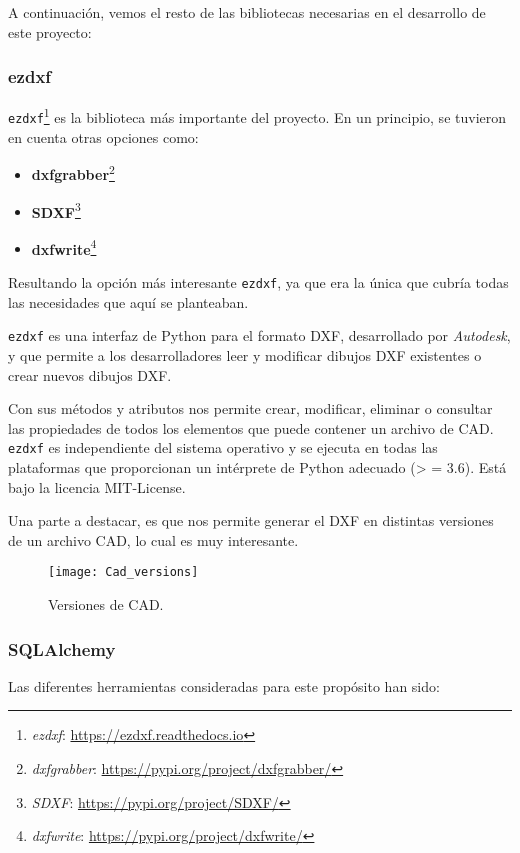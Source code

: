 A continuación, vemos el resto de las bibliotecas necesarias en el desarrollo de este proyecto:


\subsubsection{ezdxf}

\texttt{ezdxf}\footnote{\textsl{ezdxf}: \url{ https://ezdxf.readthedocs.io}} es la biblioteca más importante del proyecto. En un principio, se tuvieron en cuenta otras opciones como:
\begin{itemize}
\item \textbf{dxfgrabber}\footnote{\textsl{dxfgrabber}: \url{https://pypi.org/project/dxfgrabber/}}
\item \textbf{SDXF}\footnote{\textsl{SDXF}: \url{https://pypi.org/project/SDXF/}}
\item \textbf{dxfwrite}\footnote{\textsl{dxfwrite}: \url{https://pypi.org/project/dxfwrite/}}
\end{itemize}

Resultando la opción más interesante \texttt{ezdxf}, ya que era la única que cubría todas las necesidades que aquí se planteaban.

\texttt{ezdxf} es una interfaz de Python para el formato DXF, desarrollado por \emph{Autodesk}, y que permite a los desarrolladores leer y modificar dibujos DXF existentes o crear nuevos dibujos DXF.

Con sus métodos y atributos nos permite crear, modificar, eliminar o consultar las propiedades de todos los elementos que puede contener un archivo de CAD.
\texttt{ezdxf} es independiente del sistema operativo y se ejecuta en todas las plataformas que proporcionan un intérprete de Python adecuado (> = 3.6). Está bajo la licencia MIT-License.

Una parte a destacar, es que nos permite generar el DXF en distintas versiones de un archivo CAD, lo cual es muy interesante. 


\begin{figure}[!h]
	\centering
	\texttt{[image: Cad\_versions]}
	\caption{Versiones de CAD.}
	\label{fig:Cad_versions}
\end{figure}

\subsubsection{SQLAlchemy}
Las diferentes herramientas consideradas para este propósito han sido:

